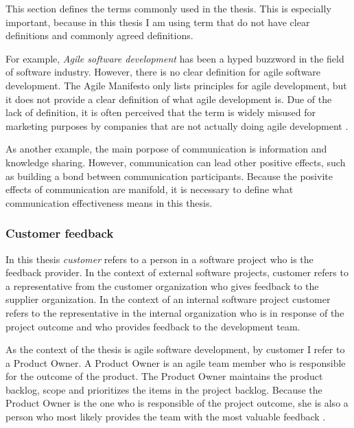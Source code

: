 \documentclass[english,12pt,a4paper,pdftex]{article}
\begin{document}
This section defines the terms commonly used in the thesis. This is especially important, because in this thesis I am using term that do not have clear definitions and commonly agreed definitions. 

For example, \emph{Agile software development} has been a hyped buzzword in the field of software industry. However, there is no clear definition for agile software development. The Agile Manifesto \citep{agilemanifesto} only lists principles for agile development, but it does not provide a clear definition of what agile development is. Due of the lack of definition, it is often perceived that the term is widely misused for marketing purposes by companies that are not actually doing agile development \citep{signleton2012}.

As another example, the main porpose of communication is information and knowledge sharing. However, communication can lead other positive effects, such as building a bond between communication participants. Because the posivite effects of communication are manifold, it is necessary to define what communication effectiveness means in this thesis.

\subsubsection{Customer feedback}

In this thesis \textit{customer} refers to a person in a software project who is the feedback provider. In the context of external software projects, customer refers to a representative from the customer organization who gives feedback to the supplier organization. In the context of an internal software project customer refers to the representative in the internal organization who is in response of the project outcome and who provides feedback to the development team.

As the context of the thesis is agile software development, by customer I refer to a Product Owner. A Product Owner is an agile team member who is responsible for the outcome of the product. The Product Owner maintains the product backlog, scope and prioritizes the items in the project backlog. Because the Product Owner is the one who is responsible of the project outcome, she is also a person who most likely provides the team with the most valuable feedback \citep{pichler2010}.
\end{document}
